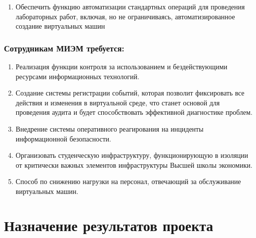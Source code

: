 \documentclass[14pt, a4paper]{extarticle}
\begin{document}
\begin{enumerate}
\item Обеспечить функцию автоматизации стандартных операций для проведения лабораторных работ, включая, но не ограничиваясь, автоматизированное создание виртуальных машин
\end{enumerate}

\subsubsection*{Сотрудникам МИЭМ требуется:}

\begin{enumerate}
\item Реализация функции контроля за использованием и бездействующими ресурсами информационных технологий.
\item Создание системы регистрации событий, которая позволит фиксировать все действия и изменения в виртуальной среде, что станет основой для проведения аудита и будет способствовать эффективной диагностике проблем.
\item Внедрение системы оперативного реагирования на инциденты информационной безопасности.
\item Организовать студенческую инфраструктуру, функционирующую в изоляции от критически важных элементов инфраструктуры Высшей школы экономики.
\item Способ по снижению нагрузки на персонал, отвечающий за обслуживание виртуальных машин.
\end{enumerate}

\section{Назначение результатов проекта}
\end{document}
